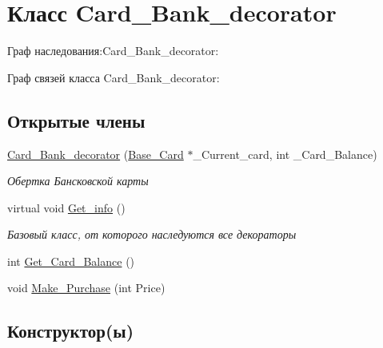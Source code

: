 \hypertarget{classCard__Bank__decorator}{}\section{Класс Card\+\_\+\+Bank\+\_\+decorator}
\label{classCard__Bank__decorator}


Граф наследования\+:Card\+\_\+\+Bank\+\_\+decorator\+:


Граф связей класса Card\+\_\+\+Bank\+\_\+decorator\+:
\subsection*{Открытые члены}
\begin{DoxyCompactItemize}
\item 
\hyperlink{classCard__Bank__decorator_ade840d4d4532b369d213d759b1c718b4}{Card\+\_\+\+Bank\+\_\+decorator} (\hyperlink{classBase__Card}{Base\+\_\+\+Card} $\ast$\+\_\+\+Current\+\_\+card, int \+\_\+\+Card\+\_\+\+Balance)
\begin{DoxyCompactList}\small\item\em Обертка Бансковской карты \end{DoxyCompactList}\item 
virtual void \hyperlink{classCard__Bank__decorator_ab8a159467a15450ea787f7eab708be62}{Get\+\_\+info} ()
\begin{DoxyCompactList}\small\item\em Базовый класс, от которого наследуются все декораторы \end{DoxyCompactList}\item 
int \hyperlink{classCard__Bank__decorator_ac528dd2f55e84d170fddd195f135a749}{Get\+\_\+\+Card\+\_\+\+Balance} ()
\item 
void \hyperlink{classCard__Bank__decorator_acbf66f0e850aff561a9f1906902611f1}{Make\+\_\+\+Purchase} (int Price)
\end{DoxyCompactItemize}


\subsection{Конструктор(ы)}

